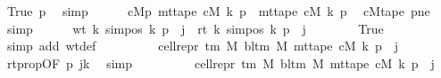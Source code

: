\begin{isabellebody}
\ True\ p{}\ \isamarkupfalse%
\ simp\isanewline
\ \ \ \ \isamarkupfalse%
\ cM{}p{\isacharcolon}{\kern0pt}\ {\isachardoublequoteopen}mt{\isacharunderscore}{\kern0pt}tape\ cM{\isacharunderscore}{\kern0pt}{}\ k\ p\ {\isacharequal}{\kern0pt}\ mt{\isacharunderscore}{\kern0pt}tape\ cM\ k\ p{\isachardoublequoteclose}\ \isamarkupfalse%
\ cM{}tape\ pne\ \isamarkupfalse%
\ simp\isanewline
\ \ \ \ \isamarkupfalse%
\ {\isachardoublequoteopen}wt\ k\ {\isacharparenleft}{\kern0pt}sim{\isacharunderscore}{\kern0pt}pos\ {\isacharquery}{\kern0pt}k\ p\ {\isacharplus}{\kern0pt}\ j{\isacharparenright}{\kern0pt}\ {\isacharequal}{\kern0pt}\ rt\ k\ {\isacharparenleft}{\kern0pt}sim{\isacharunderscore}{\kern0pt}pos\ {\isacharquery}{\kern0pt}k\ p\ {\isacharplus}{\kern0pt}\ j{\isacharparenright}{\kern0pt}{\isachardoublequoteclose}\isanewline
\ \ \ \ \ \ \isamarkupfalse%
\ True\ \isamarkupfalse%
\ {\isacharparenleft}{\kern0pt}simp\ add{\isacharcolon}{\kern0pt}\ wt{\isacharunderscore}{\kern0pt}def{\isacharparenright}{\kern0pt}\isanewline
\ \ \ \ \isamarkupfalse%
\ \isamarkupfalse%
\ {\isachardoublequoteopen}{\isasymdots}\ {\isacharequal}{\kern0pt}\ cell{\isacharunderscore}{\kern0pt}repr\ {\isacharparenleft}{\kern0pt}{\isasymGamma}{\isacharunderscore}{\kern0pt}tm\ M{\isacharparenright}{\kern0pt}\ {\isacharparenleft}{\kern0pt}bl{\isacharunderscore}{\kern0pt}tm\ M{\isacharparenright}{\kern0pt}\ {\isacharparenleft}{\kern0pt}mt{\isacharunderscore}{\kern0pt}tape\ cM\ k\ p{\isacharparenright}{\kern0pt}\ {\isacharbang}{\kern0pt}\ j{\isachardoublequoteclose}\isanewline
\ \ \ \ \ \ \isamarkupfalse%
\ rtprop{\isacharbrackleft}{\kern0pt}OF\ p{}\ jk{\isacharbrackright}{\kern0pt}\ \isamarkupfalse%
\ simp\isanewline
\ \ \ \ \isamarkupfalse%
\ \isamarkupfalse%
\ {\isachardoublequoteopen}{\isasymdots}\ {\isacharequal}{\kern0pt}\ cell{\isacharunderscore}{\kern0pt}repr\ {\isacharparenleft}{\kern0pt}{\isasymGamma}{\isacharunderscore}{\kern0pt}tm\ M{\isacharparenright}{\kern0pt}\ {\isacharparenleft}{\kern0pt}bl{\isacharunderscore}{\kern0pt}tm\ M{\isacharparenright}{\kern0pt}\ {\isacharparenleft}{\kern0pt}mt{\isacharunderscore}{\kern0pt}tape\ cM{\isacharunderscore}{\kern0pt}{}\ k\ p{\isacharparenright}{\kern0pt}\ {\isacharbang}{\kern0pt}\ j{\isachardoublequoteclose}\isanewline
\ \ \ \ \ \ \isamarkupfalse%

\end{isabellebody}
